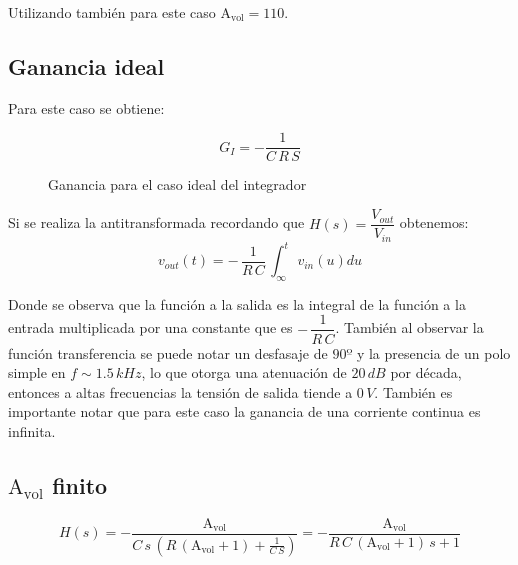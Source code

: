 \documentclass[11pt, a4paper]{article}
\begin{document}
Utilizando también para este caso $\mathrm{A_{vol}}=110$.

\subsection{Ganancia ideal} \label{gananciaidealintegrador}
Para este caso se obtiene:

\begin{equation}
G_I=-\dfrac{1}{C\,R\,S}
\end{equation}

\begin{center}
	\begin{figure}[H]	
	\caption{Ganancia para el caso ideal del integrador}
	\label{fig:avolidealintegrador}
	\end{figure}
\end{center}

Si se realiza la antitransformada recordando que $H(s)= \dfrac{V_{out}}{V_{in}}$ obtenemos:
\begin{equation} 
v_{out} (t) = - \, \dfrac{1}{R \,C} \,  \int_{\infty}^t v_{in}(u) du
\end{equation}

Donde se observa que la función a la salida es la integral de la función a la entrada multiplicada por una constante que es $- \, \dfrac{1}{R \,C}$. También al observar la función transferencia se puede notar un desfasaje de $90º$ y la presencia de un polo simple en $f \sim 1.5 \,kHz$, lo que otorga una atenuación de $20 \, dB$ por década, entonces a altas frecuencias la tensión de salida tiende a $0 \,V$. 
También es importante notar que para este caso la ganancia de una corriente continua es infinita.

\subsection{$\mathrm{A_{vol}}$ finito}
\begin{equation}
H(s)=- \dfrac{\mathrm{A_{vol}}}{C\,s\,\left(R\,\left(\mathrm{A_{vol}}+1 \right) + \frac{1}{C\,S}\right)} = -\dfrac{\mathrm{A_{vol}}}{R\,C\,\left( \mathrm{A_{vol}} + 1 \right)\,s + 1}
\end{equation}
\end{document}
